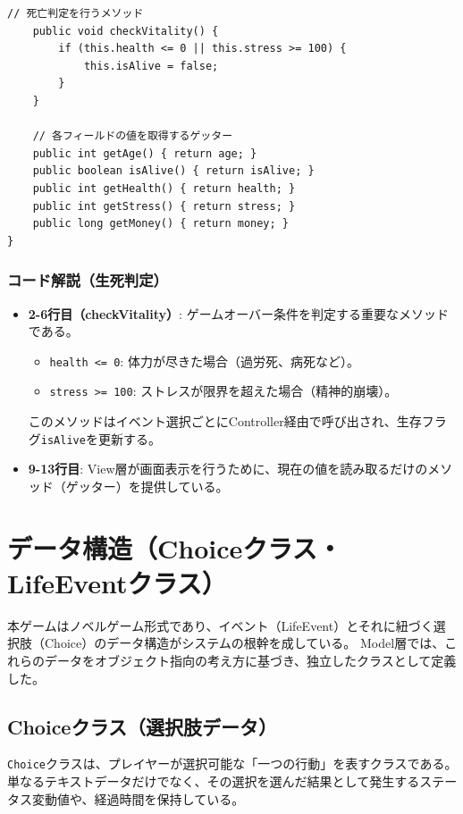 \documentclass[a4paper,11pt]{jsarticle}
\begin{document}
\begin{lstlisting}[caption=Player.java（生死判定とゲッター）, label=code:player_check]
    // 死亡判定を行うメソッド
    public void checkVitality() {
        if (this.health <= 0 || this.stress >= 100) {
            this.isAlive = false;
        }
    }

    // 各フィールドの値を取得するゲッター
    public int getAge() { return age; }
    public boolean isAlive() { return isAlive; }
    public int getHealth() { return health; }
    public int getStress() { return stress; }
    public long getMoney() { return money; }
}
\end{lstlisting}

\subsubsection*{コード解説（生死判定）}
\begin{itemize}
    \item \textbf{2-6行目（checkVitality）}: ゲームオーバー条件を判定する重要なメソッドである。
    \begin{itemize}
        \item \texttt{health <= 0}: 体力が尽きた場合（過労死、病死など）。
        \item \texttt{stress >= 100}: ストレスが限界を超えた場合（精神的崩壊）。
    \end{itemize}
    このメソッドはイベント選択ごとにController経由で呼び出され、生存フラグ\texttt{isAlive}を更新する。
    \item \textbf{9-13行目}: View層が画面表示を行うために、現在の値を読み取るだけのメソッド（ゲッター）を提供している。
\end{itemize}



\section{データ構造（Choiceクラス・LifeEventクラス）}
本ゲームはノベルゲーム形式であり、イベント（LifeEvent）とそれに紐づく選択肢（Choice）のデータ構造がシステムの根幹を成している。
Model層では、これらのデータをオブジェクト指向の考え方に基づき、独立したクラスとして定義した。



\subsection{Choiceクラス（選択肢データ）}
\texttt{Choice}クラスは、プレイヤーが選択可能な「一つの行動」を表すクラスである。
単なるテキストデータだけでなく、その選択を選んだ結果として発生するステータス変動値や、経過時間を保持している。
\end{document}
